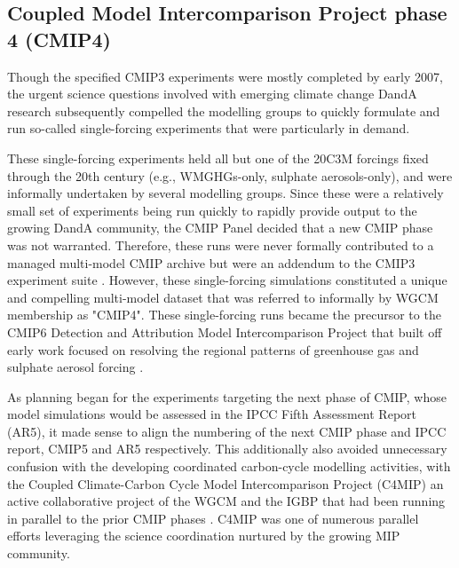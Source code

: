 \documentclass[manuscript]{copernicus}
\begin{document}
\subsection{Coupled Model Intercomparison Project phase 4 (CMIP4)}

Though the specified CMIP3 experiments were mostly completed by early 2007, the urgent science questions involved with emerging climate change DandA research subsequently compelled the modelling groups to quickly formulate and run so-called single-forcing experiments that were particularly in demand.

These single-forcing experiments held all but one of the 20C3M forcings fixed through the 20th century (e.g., WMGHGs-only, sulphate aerosols-only), and were informally undertaken by several modelling groups. Since these were a relatively small set of experiments being run quickly to rapidly provide output to the growing DandA community, the CMIP Panel decided that a new CMIP phase was not warranted. Therefore, these runs were never formally contributed to a managed multi-model CMIP archive but were an addendum to the CMIP3 experiment suite \citep{stouffer_cmip5_2017}. However, these single-forcing simulations constituted a unique and compelling multi-model dataset that was referred to informally by WGCM membership as "CMIP4". These single-forcing runs became the precursor to the CMIP6 Detection and Attribution Model Intercomparison Project \citep[DAMIP;][]{gillett_detection_2016} that built off early work focused on resolving the regional patterns of greenhouse gas and sulphate aerosol forcing \citep{taylor_response_1994, santer_towards_1995, hegerl_optimal_2000, gillett_detecting_2002, hegerl_20c3m_2003}.

As planning began for the experiments targeting the next phase of CMIP, whose model simulations would be assessed in the IPCC Fifth Assessment Report (AR5), it made sense to align the numbering of the next CMIP phase and IPCC report, CMIP5 and AR5 respectively. This additionally also avoided unnecessary confusion with the developing coordinated carbon-cycle modelling activities, with the Coupled Climate-Carbon Cycle Model Intercomparison Project (C4MIP) an active collaborative project of the WGCM and the IGBP that had been running in parallel to the prior CMIP phases \citep[e.g.,][]{fung_full-form_2000, cox_modelling_2002, friedlingstein_climatecarbon_2006}. C4MIP was one of numerous parallel efforts leveraging the science coordination nurtured by the growing MIP community.
\end{document}

